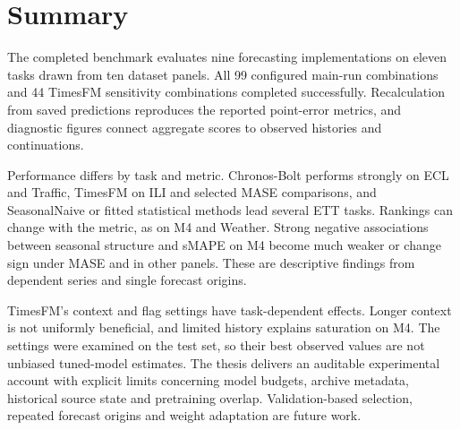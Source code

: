 \clearpage
\section{Summary}
The completed benchmark evaluates nine forecasting implementations on eleven tasks drawn from ten dataset panels. All 99 configured main-run combinations and 44 TimesFM sensitivity combinations completed successfully. Recalculation from saved predictions reproduces the reported point-error metrics, and diagnostic figures connect aggregate scores to observed histories and continuations.

Performance differs by task and metric. Chronos-Bolt performs strongly on ECL and Traffic, TimesFM on ILI and selected MASE comparisons, and SeasonalNaive or fitted statistical methods lead several ETT tasks. Rankings can change with the metric, as on M4 and Weather. Strong negative associations between seasonal structure and sMAPE on M4 become much weaker or change sign under MASE and in other panels. These are descriptive findings from dependent series and single forecast origins.

TimesFM's context and flag settings have task-dependent effects. Longer context is not uniformly beneficial, and limited history explains saturation on M4. The settings were examined on the test set, so their best observed values are not unbiased tuned-model estimates. The thesis delivers an auditable experimental account with explicit limits concerning model budgets, archive metadata, historical source state and pretraining overlap. Validation-based selection, repeated forecast origins and weight adaptation are future work.
